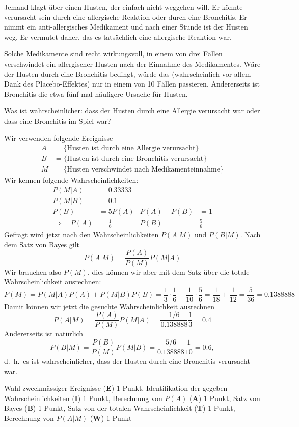 %
%
Jemand klagt über einen Husten, der einfach nicht weggehen will.
Er könnte verursacht sein durch eine allergische Reaktion oder durch
eine Bronchitis. Er nimmt ein anti-allergisches Medikament und
nach einer Stunde ist der Husten weg. Er vermutet daher, das es tatsächlich
eine allergische Reaktion war.

Solche Medikamente sind recht wirkungsvoll, in einem von drei Fällen
verschwindet ein allergischer Husten nach der Einnahme des Medikamentes.
Wäre der Husten durch eine Bronchitis bedingt, würde das (wahrscheinlich
vor allem Dank des Placebo-Effektes) nur in einem von 10 Fällen passieren.
Andererseits ist Bronchitis die etwa fünf mal häufigere Ursache für
Husten.

Was ist wahrscheinlicher: dass der Husten durch eine Allergie verursacht
war oder dass eine Bronchitis im Spiel war?

\begin{loesung}
Wir verwenden folgende Ereignisse
\begin{align*}
A&=\{\text{Husten ist durch eine Allergie verursacht}\}
\\
B&=\{\text{Husten ist durch eine Bronchitis verursacht}\}
\\
M&=\{\text{Husten verschwindet nach Medikamenteinnahme}\}
\end{align*}
Wir kennen folgende Wahrscheinlichkeiten:
\begin{align*}
P(M|A)&=0.33333\\
P(M|B)&=0.1\\
P(B)&=5P(A)&P(A)+P(B)&=1\\
\Rightarrow\quad P(A)&=\frac16&P(B)=&\frac56
\end{align*}
Gefragt wird jetzt nach den Wahrscheinlichkeiten $P(A|M)$ und $P(B|M)$.
Nach dem Satz von Bayes gilt
\[
P(A|M)=\frac{P(A)}{P(M)}P(M|A)
\]
Wir brauchen also $P(M)$, dies können wir aber mit dem Satz
über die totale Wahrscheinlichkeit ausrechnen:
\[
P(M)
=
P(M|A)P(A)+P(M|B)P(B)
=
\frac13\cdot\frac16+\frac1{10}\cdot\frac56
=
\frac1{18}+\frac1{12}=\frac{5}{36}
=
0.1388888
\]
Damit können wir jetzt die gesuchte Wahrscheinlichkeit ausrechnen
\[
P(A|M)
=
\frac{P(A)}{P(M)}P(M|A)
=
\frac{1/6}{0.138888}\frac13
=
0.4
\]
Andererseits ist natürlich
\[
P(B|M)
=
\frac{P(B)}{P(M)}P(M|B)
=
\frac{5/6}{0.138888}\frac1{10}
=
0.6,
\]
d.~h.~es ist wahrscheinlicher, dass der Husten durch eine Bronchitis
verursacht war.
\end{loesung}


\begin{bewertung}
Wahl zweckmässiger Ereignisse ({\bf E}) 1 Punkt,
Identifikation der gegeben Wahrscheinlichkeiten ({\bf I}) 1 Punkt,
Berechnung von $P(A)$ ({\bf A}) 1 Punkt,
Satz von Bayes ({\bf B}) 1 Punkt,
Satz von der totalen Wahrscheinlichkeit ({\bf T}) 1 Punkt,
Berechnung von $P(A|M)$ ({\bf W}) 1 Punkt
\end{bewertung}


